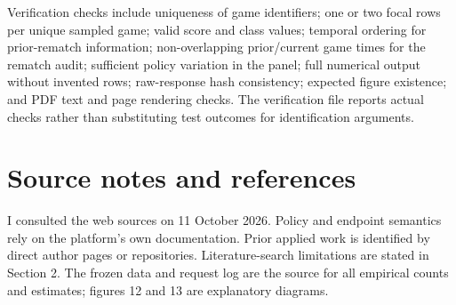 \documentclass[11pt,a4paper]{article}
\begin{document}
Verification checks include uniqueness of game identifiers; one or two focal rows per unique sampled game; valid score and class values; temporal ordering for prior-rematch information; non-overlapping prior/current game times for the rematch audit; sufficient policy variation in the panel; full numerical output without invented rows; raw-response hash consistency; expected figure existence; and PDF text and page rendering checks. The verification file reports actual checks rather than substituting test outcomes for identification arguments.

\section{Source notes and references}

I consulted the web sources on 11 October 2026. Policy and endpoint semantics rely on the platform's own documentation. Prior applied work is identified by direct author pages or repositories. Literature-search limitations are stated in Section 2. The frozen data and request log are the source for all empirical counts and estimates; figures 12 and 13 are explanatory diagrams.
\end{document}
